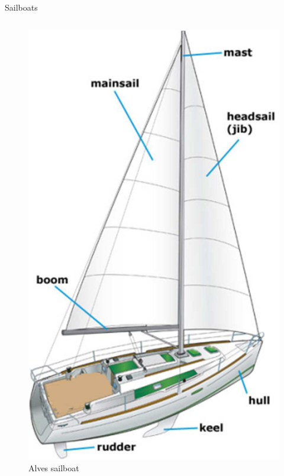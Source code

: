 \documentclass[10pt,xcolor={table,dvipsnames},t]{beamer}
\begin{document}
\begin{frame}{Sailboats}
\begin{columns}
\begin{figure}
    \centering
    \includegraphics[width=0.3\linewidth]{documents/figures/alves_sailboat.png}
    \caption{Alves sailboat \cite{Alves2010}}
    \label{fig:alves_sailboat}
\end{figure}


\end{columns}
\end{frame}
\end{document}
